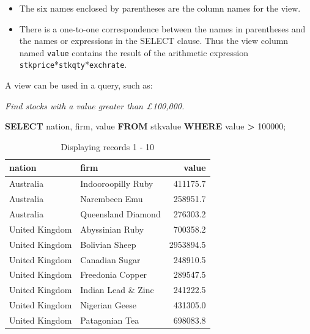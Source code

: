 \documentclass[
]{article}
\newenvironment{Shaded}{\begin{snugshade}}{\end{snugshade}}
\newcommand{\DecValTok}[1]{\textcolor[rgb]{0.00,0.00,0.81}{#1}}
\newcommand{\FunctionTok}[1]{\textcolor[rgb]{0.00,0.00,0.00}{#1}}
\newcommand{\KeywordTok}[1]{\textcolor[rgb]{0.13,0.29,0.53}{\textbf{#1}}}
\newcommand{\NormalTok}[1]{#1}
\newcommand{\OperatorTok}[1]{\textcolor[rgb]{0.81,0.36,0.00}{\textbf{#1}}}
\begin{document}
\begin{itemize}
\item
  The six names enclosed by parentheses are the column names for the
  view.
\item
  There is a one-to-one correspondence between the names in
  parentheses and the names or expressions in the SELECT clause. Thus
  the view column named \texttt{value} contains the result of the arithmetic
  expression \texttt{stkprice}*\texttt{stkqty}*\texttt{exchrate}.
\end{itemize}

A view can be used in a query, such as:

\emph{Find stocks with a value greater than £100,000.}

\begin{Shaded}
\begin{Highlighting}[]
\KeywordTok{SELECT}\NormalTok{ nation, firm, }\FunctionTok{value} \KeywordTok{FROM}\NormalTok{ stkvalue }\KeywordTok{WHERE} \FunctionTok{value} \OperatorTok{\textgreater{}} \DecValTok{100000}\NormalTok{;}
\end{Highlighting}
\end{Shaded}

\begin{table}

\caption{\label{tab:unnamed-chunk-58}Displaying records 1 - 10}
\centering
\begin{tabular}[t]{l|l|r}
\hline
nation & firm & value\\
\hline
Australia & Indooroopilly Ruby & 411175.7\\
\hline
Australia & Narembeen Emu & 258951.7\\
\hline
Australia & Queensland Diamond & 276303.2\\
\hline
United Kingdom & Abyssinian Ruby & 700358.2\\
\hline
United Kingdom & Bolivian Sheep & 2953894.5\\
\hline
United Kingdom & Canadian Sugar & 248910.5\\
\hline
United Kingdom & Freedonia Copper & 289547.5\\
\hline
United Kingdom & Indian Lead \& Zinc & 241222.5\\
\hline
United Kingdom & Nigerian Geese & 431305.0\\
\hline
United Kingdom & Patagonian Tea & 698083.8\\
\hline
\end{tabular}
\end{table}
\end{document}
